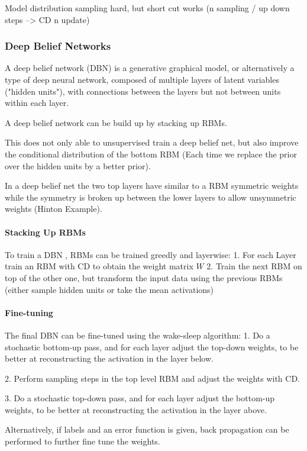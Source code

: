 Model distribution sampling hard, but short cut works (n sampling / up down steps --> CD n update) 

\subsubsection{Deep Belief Networks}

A deep belief network (DBN) is a generative graphical model, or alternatively a type of deep neural network, composed of multiple layers of latent variables ("hidden units"), with connections between the layers but not between units within each layer.

A deep belief network can be build up by stacking up RBMs.

This does not only able to unsupervised train a deep belief net, but also improve the conditional distribution of the bottom RBM (Each time we replace the prior over the hidden units by a better
prior).

In a deep belief net the two top layers have similar to a RBM symmetric weights while the symmetry is broken up between the lower layers to allow unsymmetric weights (Hinton Example).   

\paragraph{Stacking Up RBMs}

To train a DBN , RBMs can be trained greedly and layerwise:
1. For each Layer train an RBM with CD to obtain the weight matrix $W$
2. Train the next RBM on top of the other one, but transform the input data using the previous RBMs (either sample hidden units or take the mean activations)


\paragraph{Fine-tuning}

The final DBN can be fine-tuned using the wake-sleep algorithm:
1. Do a stochastic bottom-up pass, and for each layer adjust the top-down weights, to be better at reconstructing the activation in the layer below.

2. Perform sampling steps in the top level RBM and adjust the weights with CD.

3. Do a stochastic top-down pass, and for each layer adjust the bottom-up weights, to be better at reconstructing the activation in the layer above.

Alternatively, if labels and an error function is given, back propagation can be performed to further fine tune the weights.

